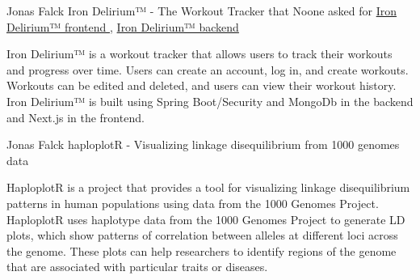 

\begin{cventries}
\cventry
  {Jonas Falck}
  { Iron Delirium™ - The Workout Tracker that Noone asked for } %
  {
  \href{ https://github.com/joe-nas/workout-app-frontend-next }{ Iron Delirium™ frontend },
  \href{ https://github.com/joe-nas/workout-app }{ Iron Delirium™ backend }
  }
  {} %
  {    
  \begin{cvitems} %
    \item { Iron Delirium™ is a workout tracker that allows users to track their workouts and progress over time. Users can create an account, log in, and create workouts. Workouts can be edited and deleted, and users can view their workout history. Iron Delirium™ is built using Spring Boot/Security and MongoDb in the backend and Next.js in the frontend. }
  \end{cvitems}
  }
 \cventry
  {Jonas Falck}
  { haploplotR - Visualizing linkage disequilibrium from 1000 genomes data } %
  {
  }
  {} %
  {    
  \begin{cvitems} %
    \item { HaploplotR is a project that provides a tool for visualizing linkage disequilibrium patterns in human populations using data from the 1000 Genomes Project. HaploplotR uses haplotype data from the 1000 Genomes Project to generate LD plots, which show patterns of correlation between alleles at different loci across the genome. These plots can help researchers to identify regions of the genome that are associated with particular traits or diseases. }
  \end{cvitems}
  }
\end{cventries}